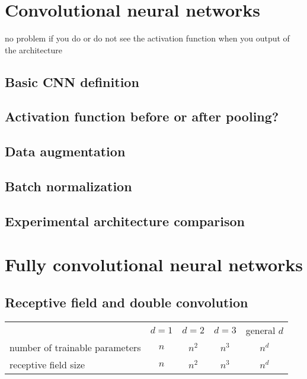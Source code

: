 \section{Convolutional neural networks}

no problem if you do or do not see the activation function when you output of the architecture 


\subsection{Basic CNN definition}
\subsection{Activation function before or after pooling?}
\subsection{Data augmentation}
\subsection{Batch normalization}
\subsection{Experimental architecture comparison}
\section{Fully convolutional neural networks}
\subsection{Receptive field and double convolution}


\begin{center}
\begin{tabular}{lcccc}
     &  $d=1$ &  $d=2$ &  $d=3$ & general $d$\\
 number of trainable parameters   &$n$& $n^2$& $n^3$ & $n^d$\\
 receptive field size  &$n$& $n^2$& $n^3$ & $n^d$
\end{tabular}
    \end{center}